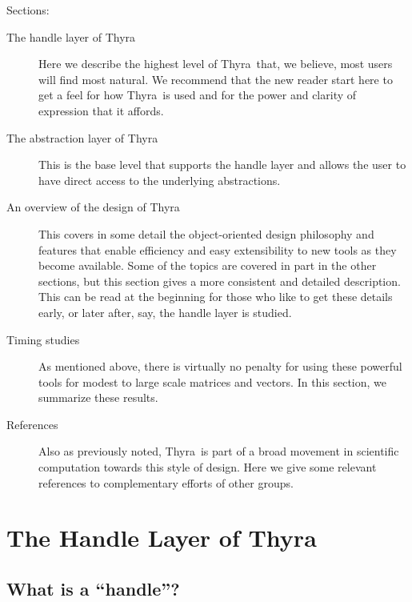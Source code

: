 \documentclass[12pt]{article}
\newcommand{\thyra}{{\sf Thyra}}
\begin{document}
Sections:
\begin{description}
    \item [The handle layer of \thyra] Here we describe the highest
  level of \thyra\ that, we believe, most users will find most
  natural.  We recommend that the new reader start here to get a feel
  for how \thyra\ is used and for the power and clarity of expression
  that it affords.
    \item [The abstraction layer of \thyra] This is the base level that
  supports the handle layer and allows the user to have direct access
  to the underlying abstractions.
    \item [An overview of the design of \thyra] This covers in some
  detail the object-oriented design philosophy and features that
  enable efficiency and easy extensibility to new tools as they become
  available.  Some of the topics are covered in part in the other sections,
  but this section gives a more consistent and detailed description.
  This can be read at the beginning for those who like to get these
  details early, or later after, say, the handle layer is studied.
    \item [Timing studies] As mentioned above, there is virtually no
  penalty for using these powerful tools for modest to large scale
  matrices and vectors.  In this section, we summarize these results.
    \item [References] Also as previously noted, \thyra\ is part of a
  broad movement in scientific computation towards this style of
  design.  Here we give some relevant references to complementary
  efforts of other groups.
\end{description}



\section{The Handle Layer of \thyra} \label{handle}

\subsection{What is a ``handle''?} \label{handleIntro}
\end{document}

